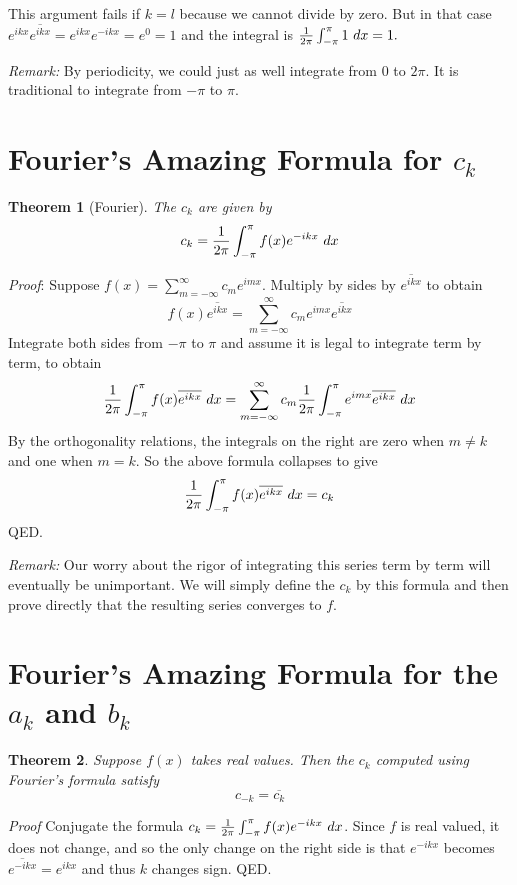 \documentclass[11pt, oneside]{amsart}
\newtheorem{theorem}{Theorem}
\begin{document}
This argument fails if $k = l$ because we cannot divide by zero. But in that case $e^{ikx} \overline{e^{ikx}} = e^{ikx} e^{-ikx} = e^0 = 1$ and the integral is ${1 \over {2 \pi}} \int_{- \pi}^\pi 1 \ dx = 1.$

{\em Remark:} By periodicity, we could just as well integrate from $0$ to $2 \pi$. It is traditional to integrate from $-\pi$ to $\pi$.

\section{Fourier's Amazing Formula for $c_k$}

\begin{theorem}[Fourier]
The $c_k$ are given by
$$c_k = {1 \over {2 \pi}} \int_{- \pi}^\pi f(x) e^{- i k x} \ dx$$
\end{theorem}

{\em Proof}: Suppose $f(x) = \sum_{m = - \infty}^\infty c_m e^{imx}$. Multiply by sides by $\overline{e^{i k x}}$ to obtain
$$f(x) \overline{e^{ikx}} = \sum_{m = - \infty}^\infty c_m e^{imx} \overline{e^{ikx}}$$
Integrate both sides from $- \pi$ to $\pi$ and assume it is legal to integrate term by term, to obtain
$${1 \over {2 \pi}} \int_{- \pi}^\pi f(x) \overline{e^{ikx}} \ dx = \sum_{m = - \infty}^\infty c_m {1 \over {2 \pi}} \int_{- \pi}^\pi e^{i m x} \overline{e^{ikx}}\ dx$$
 By the orthogonality relations, the integrals on the right are zero when $m \ne k$ and one when $m = k$. So the above formula collapses to give
 $${1 \over {2 \pi}} \int_{- \pi}^\pi f(x) \overline{e^{ikx}} \ dx = c_k$$
 QED.
 
 {\em Remark:} Our worry about the rigor of integrating this series term by term will eventually be unimportant. We will simply define the $c_k$ by this formula and then prove directly that the resulting series converges to $f$.
  
 \section{Fourier's Amazing Formula for the $a_k$ and $b_k$}
 
 \begin{theorem}
 Suppose $f(x)$ takes real values. Then the $c_k$ computed using Fourier's formula satisfy
 $$c_{-k} = \overline{c_k}$$
\end{theorem}

{\em Proof} Conjugate the formula $c_k = {1 \over {2 \pi}} \int_{- \pi}^\pi f(x) e^{- i k x} \ dx$. Since $f$ is real valued, it does not change, and so the only change on the right side is that $e^{-i k x}$ becomes
$\overline{e^{- i k x}} = e^{i k x}$ and thus $k$ changes sign. QED.
\end{document}
